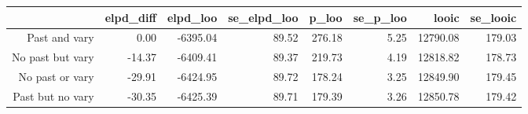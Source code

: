 \begin{table}[ht]
\centering
\begin{tabular}{rrrrrrrr}
  \hline
 & elpd\_diff & elpd\_loo & se\_elpd\_loo & p\_loo & se\_p\_loo & looic & se\_looic \\ 
  \hline
Past and vary & 0.00 & -6395.04 & 89.52 & 276.18 & 5.25 & 12790.08 & 179.03 \\ 
  No past but vary & -14.37 & -6409.41 & 89.37 & 219.73 & 4.19 & 12818.82 & 178.73 \\ 
  No past or vary & -29.91 & -6424.95 & 89.72 & 178.24 & 3.25 & 12849.90 & 179.45 \\ 
  Past but no vary & -30.35 & -6425.39 & 89.71 & 179.39 & 3.26 & 12850.78 & 179.42 \\ 
   \hline
\end{tabular}
\end{table}
